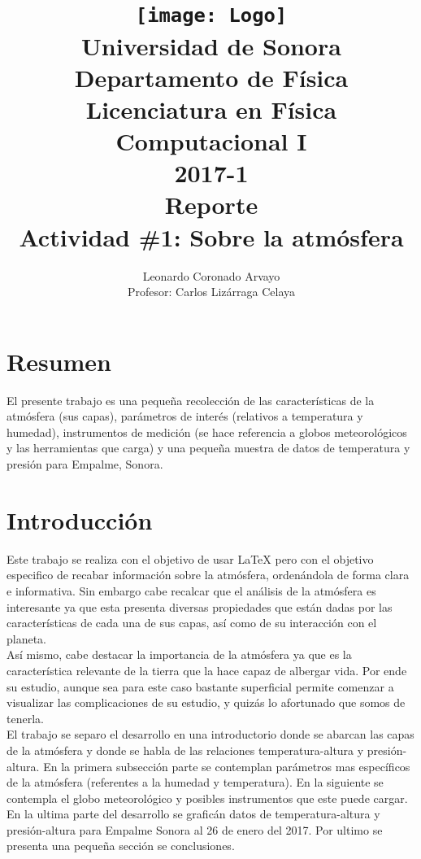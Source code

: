 \documentclass[12pt,letterpaper]{article}
\author{
Leonardo Coronado Arvayo\\
Profesor: Carlos Lizárraga Celaya   \vspace*{1.25in}}
\title{	\texttt{[image: Logo]} \\
Universidad de Sonora \\
{\small Departamento de Física \\
Licenciatura en Física \\
Computacional I \\
2017-1 \\
\vspace{0.55in} Reporte}\\ 
{\Huge Actividad \#1: Sobre la atmósfera}\\
\vspace*{1.0in}}
\begin{document}
	\maketitle
\newpage
	\tableofcontents
\pagebreak
\section{Resumen}
El presente trabajo es una pequeña recolección de las características de la atmósfera (sus capas), parámetros de interés (relativos a temperatura y humedad), instrumentos de medición (se hace referencia a globos meteorológicos y las herramientas que carga) y una pequeña muestra de datos de temperatura y presión para Empalme, Sonora. 

\section{Introducción}

Este trabajo se realiza con el objetivo de usar LaTeX pero con el objetivo especifico de recabar información sobre la atmósfera, ordenándola de forma clara e informativa. Sin embargo cabe recalcar que el análisis de la atmósfera es interesante ya que esta presenta diversas propiedades que están dadas por las características de cada una de sus capas, así como de su interacción con el planeta.\\

Así mismo, cabe destacar la importancia de la atmósfera ya que es la característica relevante de la tierra que la hace capaz de albergar vida. Por ende su estudio, aunque sea para este caso bastante superficial permite comenzar a visualizar las complicaciones de su estudio, y quizás lo afortunado que somos de tenerla. \\

El trabajo se separo el desarrollo en una introductorio donde se abarcan las capas de la atmósfera y donde se habla de las relaciones temperatura-altura y presión-altura. En la primera subsección parte se contemplan parámetros mas específicos de la atmósfera (referentes a la humedad y temperatura). En la siguiente se contempla el globo meteorológico y posibles instrumentos que este puede cargar. En la ultima parte del desarrollo se graficán datos de temperatura-altura y presión-altura para Empalme Sonora al 26 de enero del 2017. Por ultimo se presenta una pequeña sección se conclusiones.
\end{document}
